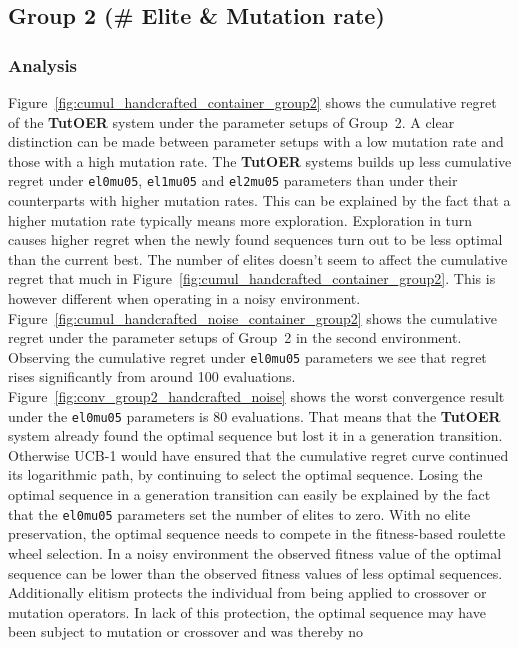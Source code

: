 \subsection{Group 2 (\# Elite \& Mutation rate)}
\label{sec:simulation_handcrafted_group2}
\subsubsection*{Analysis}
Figure~\ref{fig:cumul_handcrafted_container_group2} shows the cumulative regret
of the \textbf{TutOER} system under the parameter setups of Group~2. A clear
distinction can be made between parameter setups with a low mutation rate and those
with a high mutation rate. The \textbf{TutOER} systems builds up less cumulative
regret under \texttt{el0mu05}, \texttt{el1mu05} and \texttt{el2mu05} parameters than
under their counterparts with higher mutation rates. This can be explained by
the fact that a higher mutation rate typically means more exploration.
Exploration in turn causes higher regret when the newly found sequences turn out to be
less optimal than the current best. The number of elites doesn't seem to affect
the cumulative regret that much in
Figure~\ref{fig:cumul_handcrafted_container_group2}. This is however different
when operating in a noisy environment.
Figure~\ref{fig:cumul_handcrafted_noise_container_group2} shows the cumulative
regret under the parameter setups of Group~2 in the second environment. Observing
the cumulative regret under \texttt{el0mu05} parameters we see that regret rises
significantly from around 100 evaluations.
Figure~\ref{fig:conv_group2_handcrafted_noise} shows the worst convergence result
under the \texttt{el0mu05} parameters is 80 evaluations. That means that the
\textbf{TutOER} system already found the optimal sequence but lost it in a
generation transition. Otherwise UCB-1 would have ensured that the
cumulative regret curve continued its logarithmic path, by continuing to select
the optimal sequence. Losing the optimal
sequence in a generation transition can easily be explained by the fact that
the \texttt{el0mu05} parameters set the number of elites to zero. With no elite
preservation, the optimal sequence needs to compete in the fitness-based
roulette wheel selection. In a noisy environment the observed fitness value of
the optimal sequence can be lower than the observed fitness values of less optimal
sequences. Additionally elitism protects the individual from being applied to
crossover or mutation operators. In lack of this protection, the optimal
sequence may have been subject to mutation or crossover and was thereby no

